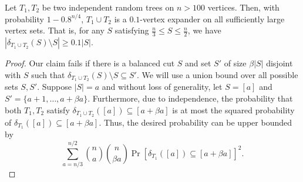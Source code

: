 \begin{lem}\label{chap5-lem:tree-expander}
Let $T_1, T_2$ be two independent random trees on $n > 100$ vertices. Then, with probability $1-0.8^{n/4}$, $T_1 \cup T_2$ is a $0.1$-vertex expander on all sufficiently large vertex sets. That is, for any $S$ satisfying $\frac{n}{3} \leq S \leq \frac{n}{2}$, we have $|\delta_{T_1 \cup T_2}(S) \setminus S| \geq 0.1 |S|$. 
\end{lem}
\begin{proof}
Our claim fails if there is a balanced cut $S$ and set $S'$ of size $\beta |S|$ disjoint with $S$ such that $\delta_{T_1 \cup T_2}(S) \setminus S \subseteq S'$. We will use a union bound over all possible sets $S, S'$. Suppose $|S| = a$ and without loss of generality, let $S = [a]$ and $S' = \{a+1, \ldots, a+\beta a\}$. Furthermore, due to independence, the probability that both $T_1, T_2$ satisfy $\delta_{T_1 \cup T_2}([a]) \subseteq [a + \beta a]$ is at most the squared probability of $\delta_{T_1}([a]) \subseteq [a + \beta a]$. Thus, the desired probability can be upper bounded by 
\[
    \sum_{a = n/3}^{n/2} \binom{n}{a} \binom{n}{\beta a} \Pr[\delta_{T_1}([a]) \subseteq [a + \beta a]]^2.
\]


\end{proof}
